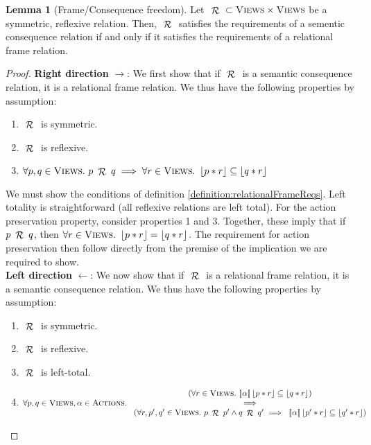 \documentclass{article}
\theoremstyle{definition}
\theoremstyle{theorem}
\newtheorem{lemma}{Lemma}
\newcommand{\Views}{\textsc{Views}}
\newcommand{\Actions}{\textsc{Actions}}
\newcommand{\action}{\alpha}
\newcommand{\curly}[1]{{ \cal #1 }}
\newcommand{\genRel}{~\mathop{\curly{R}}~}
\newcommand{\act}[1]{[\!| #1 |\!]}
\newcommand{\reify}[1]{\left\lfloor{#1}\right\rfloor}
\begin{document}
\begin{lemma}[Frame/Consequence freedom]
  Let $\genRel \subset \Views \times \Views$ be a symmetric, reflexive relation.  Then, $\genRel$ satisfies the requirements of a sementic consequence relation if and only if it satisfies the requirements of a relational frame relation.

  \begin{proof}
    \textbf{Right direction} $\rightarrow$: We first show that if $\genRel$ is a semantic consequence relation, it is a relational frame relation. We thus have the following properties by assumption:
    
    \begin{enumerate}
      \item $\genRel$ is symmetric.
      \item $\genRel$ is reflexive.
      \item $\forall p, q \in \Views.~p \genRel q \implies \forall r \in \Views.~ \reify{p * r} \subseteq \reify{q * r}$
    \end{enumerate}

    We must show the conditions of definition \ref{definition:relationalFrameReqs}. Left totality is straightforward (all reflexive relations are left total). For the action preservation property, consider properties 1 and 3. Together, these imply that if $p \genRel q$, then $\forall r \in \Views.~\reify{p * r} = \reify{q * r}$. The requirement for action preservation then follow directly from the premise of the implication we are required to show. \\

    \noindent \textbf{Left direction} $\leftarrow$: We now show that if $\genRel$ is a relational frame relation, it is a semantic consequence relation. We thus have the following properties by assumption:

    \begin{enumerate}
      \item $\genRel$ is symmetric.
      \item $\genRel$ is reflexive.
      \item $\genRel$ is left-total.
      \item \begin{displaymath}
          \forall p, q \in \Views, \action \in \Actions.~
          \begin{array}{c}
            (\forall r \in \Views.~\act{\action}\reify{p * r} \subseteq \reify{q * r})
            \\ \implies \\
            (\forall r, p', q' \in \Views.~p \genRel p' \land q \genRel q' \implies ~\act{\action}\reify{p' * r} \subseteq \reify{q' * r})
          \end{array}
        \end{displaymath}
    \end{enumerate}


\end{proof}
\end{lemma}
\end{document}
